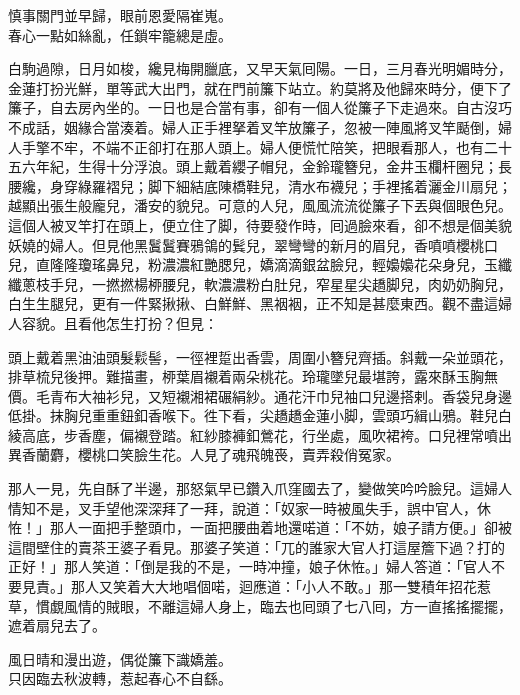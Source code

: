 \begin{myquote}
慎事關門並早歸，眼前恩愛隔崔嵬。\\春心一點如絲亂，任鎖牢籠總是虛。
\end{myquote}

白駒過隙，日月如梭，纔見梅開臘底，又早天氣囘陽。一日，三月春光明媚時分，金蓮打扮光鮮，單等武大出門，就在門前簾下站立。約莫將及他歸來時分，便下了簾子，自去房內坐的。一日也是合當有事，卻有一個人從簾子下走過來。自古沒巧不成話，姻緣合當湊着。婦人正手裡拏着叉竿放簾子，忽被一陣風將叉竿颳倒，婦人手擎不牢，不端不正卻打在那人頭上。婦人便慌忙陪笑，把眼看那人，也有二十五六年紀，生得十分浮浪。頭上戴着纓子帽兒，金鈴瓏簪兒，金井玉欄杆圈兒；長腰纔，身穿綠羅褶兒；脚下細結底陳橋鞋兒，清水布襪兒；手裡搖着灑金川扇兒；越顯出張生般龐兒，潘安的貌兒。可意的人兒，風風流流從簾子下丟與個眼色兒。這個人被叉竿打在頭上，便立住了脚，待要發作時，囘過臉來看，卻不想是個美貌妖嬈的婦人。{}但見他黑鬒鬒賽鴉鴒的鬂兒，翠彎彎的新月的眉兒，香噴噴櫻桃口兒，直隆隆瓊瑤鼻兒，粉濃濃紅艷腮兒，嬌滴滴銀盆臉兒，輕嬝嬝花朵身兒，玉纖纖蔥枝手兒，一撚撚楊桺腰兒，軟濃濃粉白肚兒，窄星星尖趫脚兒，肉奶奶胸兒，白生生腿兒，更有一件緊揪揪、白鮮鮮、黑裀裀，正不知是甚麼東西。{}觀不盡這婦人容貌。且看他怎生打扮？但見：

\begin{myquote}
頭上戴着黑油油頭髮鬏髻，一徑裡踅出香雲，周圍小簪兒齊插。斜戴一朵並頭花，排草梳兒後押。難描畫，桺葉眉襯着兩朵桃花。玲瓏墜兒最堪誇，露來酥玉胸無價。毛青布大袖衫兒，又短襯湘裙碾絹紗。{}通花汗巾兒袖口兒邊搭剌。香袋兒身邊低掛。抹胸兒重重鈕釦香喉下。徃下看，尖趫趫金蓮小脚，雲頭巧緝山鴉。鞋兒白綾高底，步香塵，偏襯登踏。紅紗膝褲釦鶯花，行坐處，風吹裙袴。口兒裡常噴出異香蘭麝，櫻桃口笑臉生花。人見了魂飛魄䘮，賣弄殺俏冤家。
\end{myquote}

那人一見，先自酥了半邊，那怒氣早已鑽入爪窪國去了，變做笑吟吟臉兒。這婦人情知不是，叉手望他深深拜了一拜，說道：「奴家一時被風失手，誤中官人，休恠！」那人一面把手整頭巾，一面把腰曲着地還喏道：「不妨，娘子請方便。」卻被這間壁住的賣茶王婆子看見。{}那婆子笑道：「兀的誰家大官人打這屋簷下過？打的正好！」那人笑道：「倒是我的不是，一時冲撞，娘子休恠。」婦人答道：「官人不要見責。」那人又笑着大大地唱個喏，迴應道：「小人不敢。」那一雙積年招花惹草，慣覷風情的賊眼，不離這婦人身上，{}臨去也囘頭了七八囘，方一直搖搖擺擺，遮着扇兒去了。

\begin{myquote}
風日晴和漫出遊，偶從簾下識嬌羞。\\只因臨去秋波轉，惹起春心不自繇。
\end{myquote}

